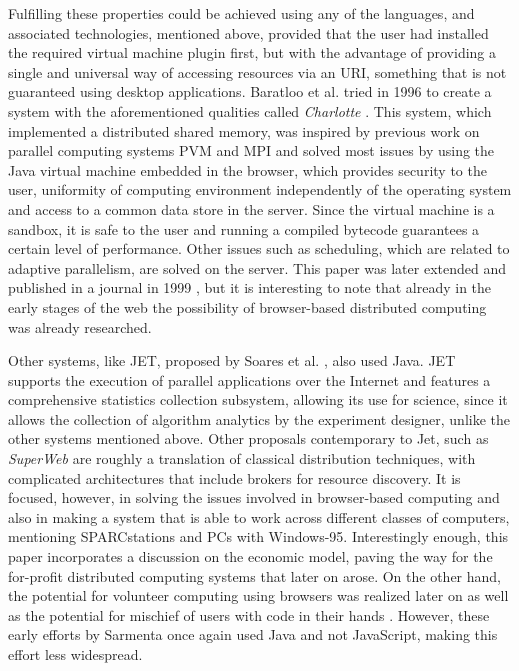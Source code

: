 \documentclass[journal,onecolumn]{IEEEtran}
\begin{document}
Fulfilling these properties could be achieved using any of the
languages, and associated technologies, mentioned above, provided that the user had
installed the required virtual machine plugin first, but with the advantage of
providing a single and universal way of accessing resources via an
URI, something that is not guaranteed using desktop
applications. Baratloo et al. tried in 1996 to create a system with
the aforementioned qualities called {\em Charlotte}
\cite{baratloo1996charlotte}. This system, which implemented a
distributed shared memory, was inspired by previous work
on parallel computing systems PVM and MPI and solved most issues by
using the Java virtual machine embedded in the browser,
which provides
security to the user, uniformity of computing environment
independently of the operating system and access to a common data store in the
server. Since the virtual machine is a sandbox, it is safe to the user
and running a compiled bytecode guarantees a certain level of
performance. 
 Other issues such as scheduling, which are related to adaptive
 parallelism, are solved on the server. This 
paper was later extended and published in a journal in 1999
\cite{baratloo1999charlotte}, but it is interesting to note that
already in the early stages of the web the possibility of
browser-based distributed computing was already researched. 

Other systems, like JET, proposed by Soares et
al. \cite{soares1998get}, also used Java. JET supports 
the execution of parallel applications over the Internet and features
a comprehensive statistics collection subsystem, allowing its use for science,
since it allows the collection of algorithm analytics by the
experiment designer, unlike the other systems mentioned
above. Other proposals contemporary to Jet, such as {\em SuperWeb}
\cite{alexandrov1997superweb} are roughly a translation of classical
distribution techniques, with complicated architectures that include
brokers for resource discovery. It is focused, however, in solving the
issues involved in browser-based computing and also in making a system
that is able to work across different classes of computers, mentioning
SPARCstations and PCs with Windows-95. Interestingly enough, this
paper incorporates a discussion on the economic model, paving the way
for the for-profit distributed computing systems that later on
arose. On the other hand, the potential for volunteer computing using
browsers was realized 
later on \cite{sarmenta-bayanihan} as well as the potential for
mischief of users with code in their hands
\cite{sarmenta-sabotagetolerance}. However, these early efforts by
Sarmenta once again used Java and not JavaScript, making this effort
less widespread.
\end{document}
